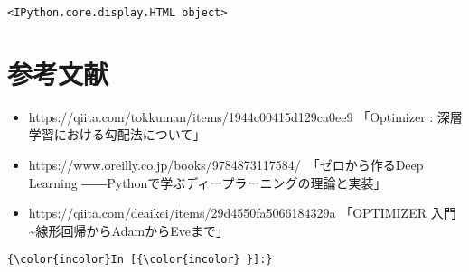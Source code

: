 \documentclass[11pt]{article}
\providecommand{\tightlist}{%
      \setlength{\itemsep}{0pt}\setlength{\parskip}{0pt}}
\begin{document}
    \begin{verbatim}
<IPython.core.display.HTML object>
    \end{verbatim}

    
    \section{参考文献}\label{ux53c2ux8003ux6587ux732e}

\begin{itemize}
\tightlist
\item
  https://qiita.com/tokkuman/items/1944c00415d129ca0ee9 「Optimizer :
  深層学習における勾配法について」
\item
  https://www.oreilly.co.jp/books/9784873117584/　「ゼロから作るDeep
  Learning ――Pythonで学ぶディープラーニングの理論と実装」
\item
  https://qiita.com/deaikei/items/29d4550fa5066184329a 「OPTIMIZER 入門
  \textasciitilde{}線形回帰からAdamからEveまで」
\end{itemize}

    \begin{Verbatim}[commandchars=\\\{\}]
{\color{incolor}In [{\color{incolor} }]:} 
\end{Verbatim}


    
    
    
    
\end{document}
